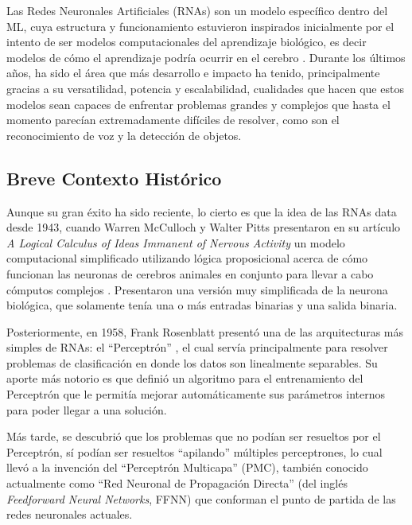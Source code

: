 \documentclass[../../main.tex]{subfiles}
\begin{document}
Las Redes Neuronales Artificiales (RNAs) son un modelo específico dentro del ML, cuya
estructura y funcionamiento estuvieron inspirados inicialmente por el intento de ser
modelos computacionales del aprendizaje biológico, es decir modelos de cómo el aprendizaje
podría ocurrir en el cerebro \cite{deep-learning}. Durante los últimos años, ha sido el
área que más desarrollo e impacto ha tenido, principalmente gracias a su versatilidad,
potencia y escalabilidad, cualidades que hacen que estos modelos sean capaces de
enfrentar problemas grandes y complejos \cite{hands-on-ML-sklearn-tf} que hasta el momento
parecían extremadamente difíciles de resolver, como son el reconocimiento de voz y la
detección de objetos.

\subsection{Breve Contexto Histórico}
Aunque su gran éxito ha sido reciente, lo cierto es que la idea de las RNAs data desde
1943, cuando Warren McCulloch y Walter Pitts presentaron en su artículo \textit{A Logical
Calculus of Ideas Immanent of Nervous Activity} \cite{mculloch-pitts-1943} un modelo
computacional simplificado utilizando lógica proposicional acerca de cómo funcionan las
neuronas de cerebros animales en conjunto para llevar a cabo cómputos complejos
\cite{hands-on-ML-sklearn-tf}. Presentaron una versión muy simplificada de la neurona
biológica, que solamente tenía una o más entradas binarias y una salida binaria.

Posteriormente, en 1958, Frank Rosenblatt presentó una de las arquitecturas más simples de
RNAs: el ``Perceptrón'' \cite{rosenblatt1958perceptron}, el cual servía principalmente
para resolver problemas de clasificación en donde los datos son linealmente separables. Su
aporte más notorio es que definió un algoritmo para el entrenamiento del Perceptrón que le
permitía mejorar automáticamente sus parámetros internos para poder llegar a una solución.

Más tarde, se descubrió que los problemas que no podían ser resueltos por el Perceptrón,
sí podían ser resueltos ``apilando'' múltiples perceptrones, lo cual llevó a la invención
del ``Perceptrón Multicapa'' (PMC), también conocido actualmente como ``Red Neuronal de
Propagación Directa'' \footnotemark (del inglés \textit{Feedforward Neural Networks}, FFNN)
\cite{deep-learning} que conforman el punto de partida de las redes neuronales actuales.
\end{document}
